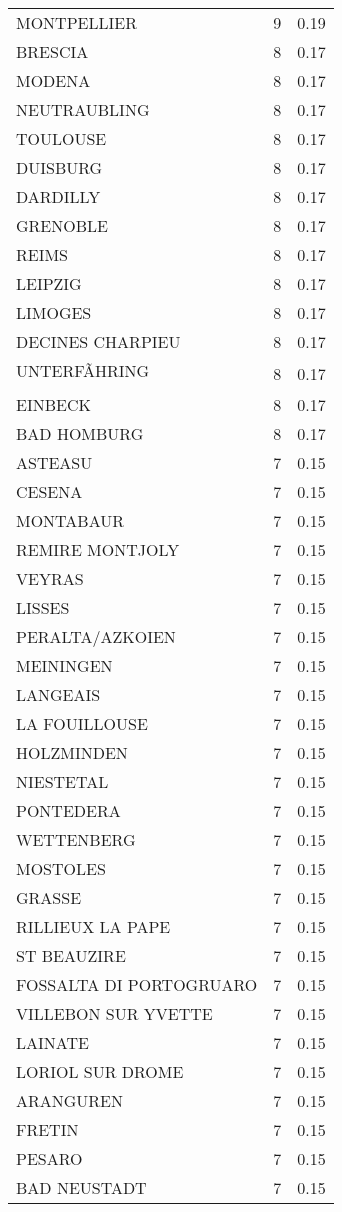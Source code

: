 \begin{table*}[htbp]
\begin{tabular}{lrr}
MONTPELLIER & 9 & 0.19 \\
BRESCIA & 8 & 0.17 \\
MODENA & 8 & 0.17 \\
NEUTRAUBLING & 8 & 0.17 \\
TOULOUSE & 8 & 0.17 \\
DUISBURG & 8 & 0.17 \\
DARDILLY & 8 & 0.17 \\
GRENOBLE & 8 & 0.17 \\
REIMS & 8 & 0.17 \\
LEIPZIG & 8 & 0.17 \\
LIMOGES & 8 & 0.17 \\
DECINES CHARPIEU & 8 & 0.17 \\
UNTERFÃHRING & 8 & 0.17 \\
EINBECK & 8 & 0.17 \\
BAD HOMBURG & 8 & 0.17 \\
ASTEASU & 7 & 0.15 \\
CESENA & 7 & 0.15 \\
MONTABAUR & 7 & 0.15 \\
REMIRE MONTJOLY & 7 & 0.15 \\
VEYRAS & 7 & 0.15 \\
LISSES & 7 & 0.15 \\
PERALTA/AZKOIEN & 7 & 0.15 \\
MEININGEN & 7 & 0.15 \\
LANGEAIS & 7 & 0.15 \\
LA FOUILLOUSE & 7 & 0.15 \\
HOLZMINDEN & 7 & 0.15 \\
NIESTETAL & 7 & 0.15 \\
PONTEDERA & 7 & 0.15 \\
WETTENBERG & 7 & 0.15 \\
MOSTOLES & 7 & 0.15 \\
GRASSE & 7 & 0.15 \\
RILLIEUX LA PAPE & 7 & 0.15 \\
ST BEAUZIRE & 7 & 0.15 \\
FOSSALTA DI PORTOGRUARO & 7 & 0.15 \\
VILLEBON SUR YVETTE & 7 & 0.15 \\
LAINATE & 7 & 0.15 \\
LORIOL SUR DROME & 7 & 0.15 \\
ARANGUREN & 7 & 0.15 \\
FRETIN & 7 & 0.15 \\
PESARO & 7 & 0.15 \\
BAD NEUSTADT & 7 & 0.15 \\

\end{tabular}
\end{table*}
